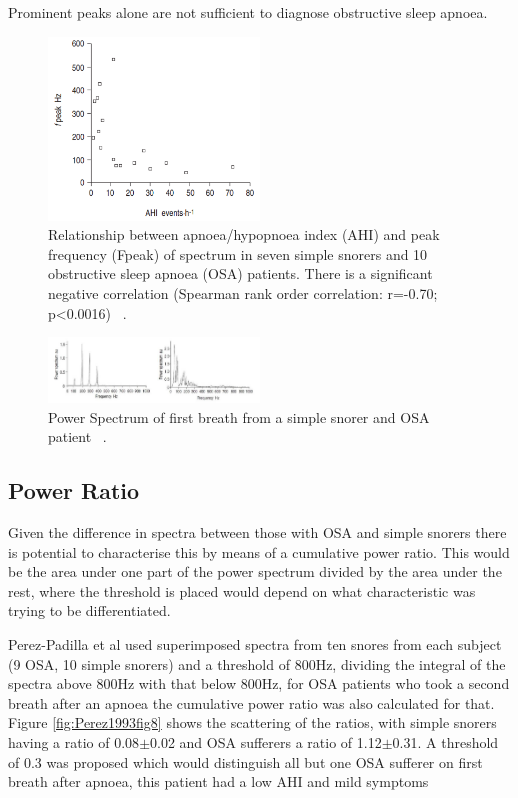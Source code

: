 Prominent peaks alone are not sufficient to diagnose obstructive sleep apnoea. 
\begin{figure}[h]
\centering 
\includegraphics[width=0.5\textwidth]{drawings/Fiz1996fig3}
\caption{Relationship between apnoea/hypopnoea index (AHI) and
peak frequency (Fpeak) of spectrum in seven simple snorers and 10
obstructive sleep apnoea (OSA) patients. There is a significant negative correlation (Spearman rank
order correlation: r=-0.70; p<0.0016) ~\cite{fiz1996acoustic}.}
\label{fig: Fiz1996fig3}
\end{figure}
\begin{figure}[h]
\centering 
\includegraphics[width=0.5\textwidth]{drawings/Fiz1996fig12}
\caption{Power Spectrum of first breath from a simple snorer and OSA patient ~\cite{fiz1996acoustic}.}
\label{fig: Fiz1996fig12}
\end{figure}


\subsection{Power Ratio}
Given the difference in spectra between those with OSA and simple snorers there is potential to characterise this by means of a cumulative power ratio. This would be the area under one part of the power spectrum divided by the area under the rest, where the threshold is placed would depend on what characteristic was trying to be differentiated. 

Perez-Padilla et al used superimposed spectra from ten snores from each subject (9 OSA, 10 simple snorers) and a threshold of 800Hz, dividing the integral of the spectra above 800Hz with that below 800Hz, for OSA patients who took a second breath after an apnoea the cumulative power ratio was also calculated for that. Figure \ref{fig:Perez1993fig8} shows the scattering of the ratios, with simple snorers having a ratio of 0.08$\pm$0.02 and OSA sufferers a ratio of 1.12$\pm$0.31. A threshold of 0.3 was proposed which would distinguish all but one OSA sufferer on first breath after apnoea, this patient had a low AHI and mild symptoms ~\cite{whitelaw1993characteristics}

